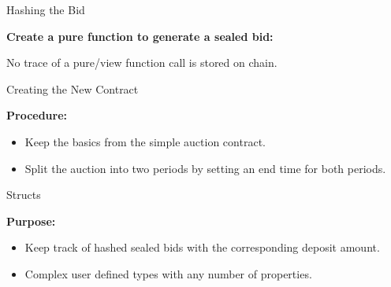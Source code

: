 \documentclass[]{beamer}
\begin{document}
\begin{frame}{Hashing the Bid}

	\textbf{Create a pure function to generate a sealed bid:}
	
	
	
	No trace of a pure/view function call is stored on chain.\\
	
\end{frame}

\begin{frame}[allowframebreaks]{Creating the New Contract}

	\textbf{Procedure:}
	
	\begin{itemize}
		\item Keep the basics from the simple auction contract.
		\item Split the auction into two periods by setting an end time for both periods.	
	\end{itemize}
	
	

\end{frame}

\begin{frame}{Structs}

	\textbf{Purpose:}
	
	\begin{itemize}
		\item Keep track of hashed sealed bids with the corresponding deposit amount.
		\item Complex user defined types with any number of properties.
	\end{itemize}
	
	
	
	
\end{frame}
\end{document}
